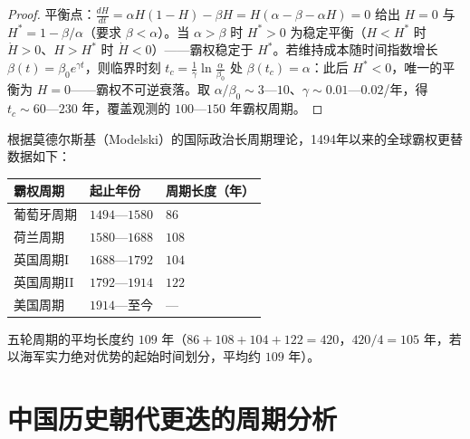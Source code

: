 \begin{proof}
平衡点：$\frac{dH}{dt} = \alpha H(1-H) - \beta H = H(\alpha - \beta - \alpha H) = 0$ 给出 $H = 0$ 与 $H^* = 1 - \beta/\alpha$（要求 $\beta < \alpha$）。当 $\alpha > \beta$ 时 $H^* > 0$ 为稳定平衡（$H < H^*$ 时 $\dot H > 0$、$H > H^*$ 时 $\dot H < 0$）——霸权稳定于 $H^*$。若维持成本随时间指数增长 $\beta(t) = \beta_0 e^{\gamma t}$，则临界时刻 $t_c = \frac{1}{\gamma}\ln\frac{\alpha}{\beta_0}$ 处 $\beta(t_c) = \alpha$：此后 $H^* < 0$，唯一的平衡为 $H = 0$——霸权不可逆衰落。取 $\alpha/\beta_0 \sim 3$—$10$、$\gamma \sim 0.01$—$0.02$/年，得 $t_c \sim 60$—$230$ 年，覆盖观测的 $100$—$150$ 年霸权周期。
\end{proof}

\begin{example}[全球霸权周期的实证数据]\label{ex:hegemony_data}
根据莫德尔斯基（Modelski）的国际政治长周期理论，1494年以来的全球霸权更替数据如下：
\begin{center}
\begin{tabular}{>{\centering\arraybackslash}p{2.5cm}>{\centering\arraybackslash}p{2cm}>{\centering\arraybackslash}p{2cm}}
\toprule
霸权周期 & 起止年份 & 周期长度（年） \\
\midrule
葡萄牙周期 & $1494$—$1580$ & $86$ \\
荷兰周期 & $1580$—$1688$ & $108$ \\
英国周期I & $1688$—$1792$ & $104$ \\
英国周期II & $1792$—$1914$ & $122$ \\
美国周期 & $1914$—至今 & — \\
\bottomrule
\end{tabular}
\end{center}
五轮周期的平均长度约 $109$ 年（$86+108+104+122=420$，$420/4=105$ 年，若以海军实力绝对优势的起始时间划分，平均约 $109$ 年）。
\end{example}

\section{中国历史朝代更迭的周期分析}

